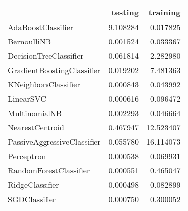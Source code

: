 \begin{tabular}{lrr}
\toprule
{} &   testing &   training \\
\midrule
AdaBoostClassifier          &  9.108284 &   0.017825 \\
BernoulliNB                 &  0.001524 &   0.033367 \\
DecisionTreeClassifier      &  0.061814 &   2.282980 \\
GradientBoostingClassifier  &  0.019202 &   7.481363 \\
KNeighborsClassifier        &  0.000843 &   0.043992 \\
LinearSVC                   &  0.000616 &   0.096472 \\
MultinomialNB               &  0.002293 &   0.046664 \\
NearestCentroid             &  0.467947 &  12.523407 \\
PassiveAggressiveClassifier &  0.055780 &  16.114073 \\
Perceptron                  &  0.000538 &   0.069931 \\
RandomForestClassifier      &  0.000551 &   0.465047 \\
RidgeClassifier             &  0.000498 &   0.082899 \\
SGDClassifier               &  0.000750 &   0.300052 \\
\bottomrule
\end{tabular}
